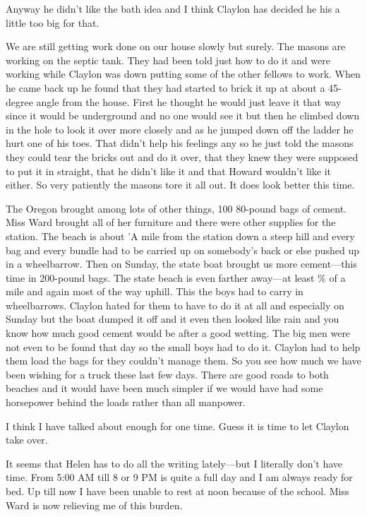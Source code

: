 \documentclass[
]{book}
\begin{document}
Anyway he didn't like the bath idea and I think Claylon has decided he his a little too big for that.

We are still getting work done on our house slowly but surely. The masons are working on the septic tank. They had been told just how to do it and were working while Claylon was down putting some of the other fellows to work. When he came back up he found that they had started to brick it up at about a 45-degree angle from the house. First he thought he would just leave it that way since it would be underground and no one would see it but then he climbed down in the hole to look it over more closely and as he jumped down off the ladder he hurt one of his toes. That didn't help his feelings any so he just told the masons they could tear the bricks out and do it over, that they knew they were supposed to put it in straight, that he didn't like it and that Howard wouldn't like it either. So very patiently the masons tore it all out. It does look better this time.

The Oregon brought among lots of other things, 100 80-pound bags of cement. Miss Ward brought all of her furniture and there were other supplies for the station. The beach is about 'A mile from the station down a steep hill and every bag and every bundle had to be carried up on somebody's back or else pushed up in a wheelbarrow. Then on Sunday, the state boat brought us more cement---this time in 200-pound bags. The state beach is even farther away---at least \% of a mile and again most of the way uphill. This the boys had to carry in wheelbarrows. Claylon hated for them to have to do it at all and especially on Sunday but the boat dumped it off and it even then looked like rain and you know how much good cement would be after a good wetting. The big men were not even to be found that day so the small boys had to do it. Claylon had to help them load the bags for they couldn't manage them. So you see how much we have been wishing for a truck these last few days. There are good roads to both beaches and it would have been much simpler if we would have had some horsepower behind the loads rather than all manpower.

I think I have talked about enough for one time. Guess it is time to let Claylon take over.

It seems that Helen has to do all the writing lately---but I literally don't have time. From 5:00 AM till 8 or 9 PM is quite a full day and I am always ready for bed. Up till now I have been unable to rest at noon because of the school. Miss Ward is now relieving me of this burden.
\end{document}
